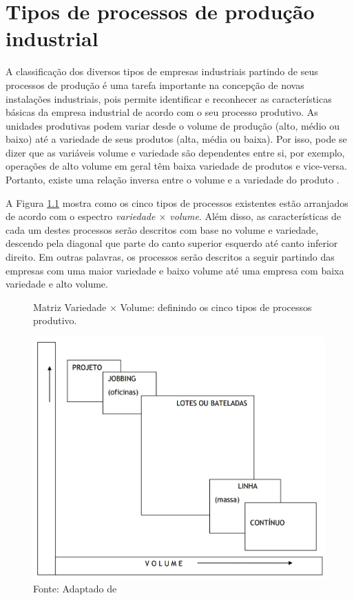 \chapter{Tipos de processos de produção industrial}
\label{chap:tipos_de_processo_de_producao}

A classificação dos diversos tipos de empresas industriais partindo de seus processos de produção é uma tarefa importante na concepção de novas instalações industriais, pois permite identificar e reconhecer as características básicas da empresa industrial de acordo com o seu processo produtivo. As unidades produtivas podem variar desde o volume de produção (alto, médio ou baixo) até a variedade de seus produtos (alta, média ou baixa). Por isso, pode se dizer que as variáveis volume e variedade são dependentes entre si, por exemplo, operações de alto volume em geral têm baixa variedade de produtos e vice-versa. Portanto, existe uma relação inversa entre o volume e a variedade do produto \cite{slack2009administracao}.

A Figura \ref{fig:tipos_de_processo_de_producao} mostra como os cinco tipos de processos existentes estão arranjados de acordo com o espectro \textit{variedade $\times$ volume}. Além disso, as características de cada um destes processos serão descritos com base no volume e variedade, descendo pela diagonal que parte do canto superior esquerdo até canto inferior direito. Em outras palavras, os processos serão descritos a seguir partindo das empresas com uma maior variedade e baixo volume até uma empresa com baixa variedade e alto volume.

\begin{figure}[H]
  \centering
  \caption{Matriz Variedade $\times$ Volume: definindo os cinco tipos de processos produtivo.} %
  \includegraphics[width=.7\textwidth]{images/tiposdeprocesso.png}
  \caption*{Fonte: Adaptado de \cite{slack2009administracao}}
  \label{fig:tipos_de_processo_de_producao}
\end{figure}

